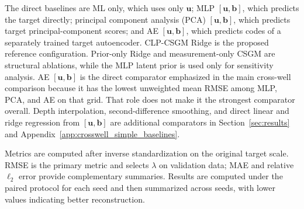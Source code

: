 The direct baselines are ML only, which uses only $\boldsymbol{u}$; MLP
$[\boldsymbol{u},\boldsymbol{b}]$, which predicts the target directly;
principal component analysis (PCA)
$[\boldsymbol{u},\boldsymbol{b}]$, which predicts target principal-component
scores; and AE $[\boldsymbol{u},\boldsymbol{b}]$, which predicts codes of a
separately trained target autoencoder. CLP-CSGM Ridge is the proposed reference
configuration.
Prior-only Ridge and measurement-only CSGM are structural ablations, while the
MLP latent prior is used only for sensitivity analysis.
AE $[\boldsymbol{u},\boldsymbol{b}]$ is the direct comparator emphasized in
the main cross-well comparison because it has the lowest unweighted mean
RMSE among MLP, PCA, and AE on that grid. That role does not make it the
strongest comparator overall. Depth interpolation, second-difference
smoothing, and direct linear and ridge regression from
$[\boldsymbol{u},\boldsymbol{b}]$ are additional comparators in
Section~\ref{sec:results} and
Appendix~\ref{app:crosswell_simple_baselines}.

Metrics are computed after inverse standardization on the original target
scale. RMSE is the primary metric and selects $\lambda$ on validation data;
MAE and relative $\ell_2$ error provide complementary summaries. Results are
computed under the paired protocol for each seed and then summarized across
seeds, with lower values indicating better reconstruction.

